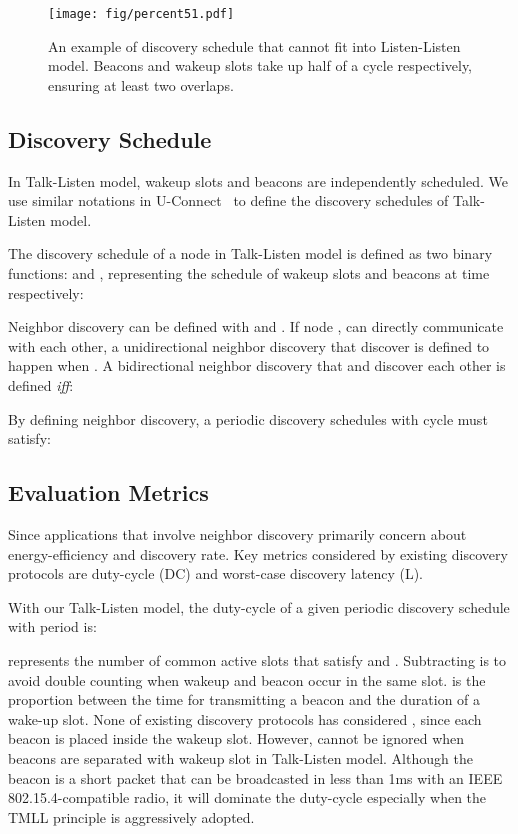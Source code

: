 \documentclass[conference]{IEEEtran}
\begin{document}
\begin{figure}[t]
    \centering
    \texttt{[image: fig/percent51.pdf]}
    \caption{An example of discovery schedule that cannot fit into Listen-Listen model.
             Beacons and wakeup slots take up half of a cycle respectively, ensuring at least two overlaps.}\label{examplellcanntexplain}
\end{figure}

\subsection{Discovery Schedule}
In Talk-Listen model, wakeup slots and beacons are independently scheduled.
We use similar notations in U-Connect~\cite{kandhalu2010u} to define the discovery schedules of Talk-Listen model.

The discovery schedule of a node  in Talk-Listen model is defined as two binary functions:
 and ,
representing the schedule of wakeup slots and beacons at time  respectively:


Neighbor discovery can be defined with  and .
If node ,  can directly communicate with each other, 
a unidirectional neighbor discovery that  discover  is defined to happen when .
A bidirectional neighbor discovery that  and  discover each other is defined \emph{iff}:


By defining neighbor discovery, a periodic discovery schedules with cycle  must satisfy:


\subsection{Evaluation Metrics}

Since applications that involve neighbor discovery primarily concern about energy-efficiency and discovery rate.
Key metrics considered by existing discovery protocols are duty-cycle (DC) and worst-case discovery latency (L).

With our Talk-Listen model, the duty-cycle  of a given periodic discovery schedule with period  is:

 represents the number of common active slots that satisfy  and .
Subtracting  is to avoid double counting when wakeup and beacon occur in the same slot.
 is the proportion between the time for transmitting a beacon and the duration of a wake-up slot.
None of existing discovery protocols has considered , since each beacon is placed inside the wakeup slot.
However,  cannot be ignored when beacons are separated with wakeup slot in Talk-Listen model.
Although the beacon is a short packet that can be broadcasted in less than 1ms with an IEEE 802.15.4-compatible radio,
it will dominate the duty-cycle especially when the TMLL principle is aggressively adopted.
\end{document}
